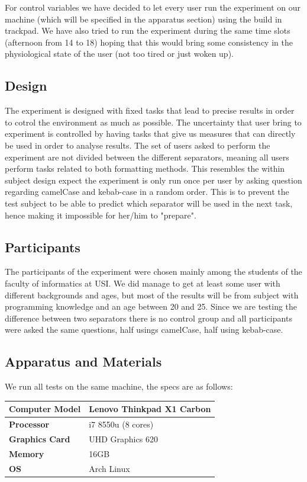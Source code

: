 \documentclass{article}
\begin{document}
For control variables we have decided to let every user run the experiment on our machine (which will be specified in the apparatus section) using 
the build in trackpad. We have also tried to run the experiment during the same time slots (afternoon from 14 to 18) hoping that this would 
bring some consistency in the physiological state of the user (not too tired or just woken up).

\subsection{Design}
The experiment is designed with fixed tasks that lead to precise results in order to cotrol the environment as much as possible. The uncertainty that 
user bring to experiment is controlled by having tasks that give us measures that can directly be used in order to analyse results. The set of users asked to 
perform the experiment are not divided between the different separators, meaning all users perform tasks related to both formatting methods. This resembles the 
within subject design expect the experiment is only run once per user by asking question regarding camelCase and kebab-case in a random order. This is to prevent 
the test subject to be able to predict which separator will be used in the next task, hence making it impossible for her/him to "prepare".

\subsection{Participants}
The participants of the experiment were chosen mainly among the students of the faculty of informatics at USI. We did manage to get at least some user 
with different backgrounds and ages, but most of the results will be from subject with programming knowledge and an age between 20 and 25. Since we are testing the difference 
between two separators there is no control group and all participants were asked the same questions, half usings camelCase, half using kebab-case.

\subsection{Apparatus and Materials}
We run all tests on the same machine, the specs are as follows:
\label{apparatus}
\begin{center}
	\begin{tabular}{ll}
		\hline
		\hline
		\textbf{Computer Model} &  Lenovo Thinkpad X1 Carbon\\
		\hline
		\textbf{Processor}      &  i7 8550u (8 cores)\\
		\textbf{Graphics Card}  &  UHD Graphics 620\\
		\textbf{Memory}         &  16GB \\
		\textbf{OS}             &  Arch Linux\\
		\hline
		\hline
	\end{tabular}
\end{center}
\end{document}
